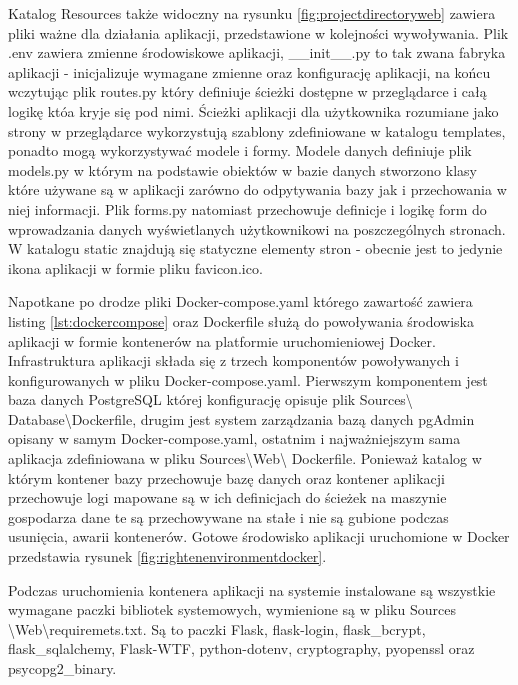 \documentclass[a4paper, 10pt, twoside, openright]{report}
\begin{document}
\begin{large}
{Katalog Resources także widoczny na rysunku \ref*{fig:projectdirectoryweb} 
zawiera pliki ważne dla działania aplikacji, przedstawione w kolejności 
wywoływania. Plik .env zawiera zmienne środowiskowe aplikacji, \_\_init\_\_.py 
to tak zwana fabryka aplikacji - inicjalizuje wymagane zmienne oraz konfigurację
 aplikacji, na końcu wczytując plik routes.py który definiuje ścieżki dostępne 
w przeglądarce i całą logikę któa kryje się pod nimi. Ścieżki aplikacji dla 
użytkownika rozumiane jako strony w przeglądarce wykorzystują szablony 
zdefiniowane w katalogu templates, ponadto mogą wykorzystywać modele i formy. 
Modele danych definiuje plik models.py w którym na podstawie obiektów w bazie 
danych stworzono klasy które używane są w aplikacji zarówno do odpytywania bazy 
jak i przechowania w niej informacji. Plik forms.py natomiast przechowuje 
definicje i logikę form do wprowadzania danych wyświetlanych użytkownikowi na 
poszczególnych stronach. W katalogu static znajdują się statyczne elementy stron
 - obecnie jest to jedynie ikona aplikacji w formie pliku favicon.ico.}

\medskip
{Napotkane po drodze pliki Docker-compose.yaml którego zawartość zawiera listing
 \ref*{lst:dockercompose} oraz Dockerfile służą do powoływania środowiska 
aplikacji w formie kontenerów na platformie uruchomieniowej Docker. 
Infrastruktura aplikacji składa się z trzech komponentów powoływanych i 
konfigurowanych w pliku Docker-compose.yaml. Pierwszym komponentem jest baza 
danych PostgreSQL której konfigurację opisuje plik Sources\textbackslash
Database\textbackslash Dockerfile, drugim jest system zarządzania bazą danych 
pgAdmin opisany w samym Docker-compose.yaml, ostatnim i najważniejszym sama 
aplikacja zdefiniowana w pliku Sources\textbackslash Web\textbackslash
Dockerfile. Ponieważ katalog w którym kontener bazy przechowuje bazę danych oraz
 kontener aplikacji przechowuje logi mapowane są w ich definicjach do ścieżek na
 maszynie gospodarza dane te są przechowywane na stałe i nie są gubione podczas 
usunięcia, awarii kontenerów. Gotowe środowisko aplikacji uruchomione w Docker 
przedstawia rysunek \ref*{fig:rightenenvironmentdocker}.}

{Podczas uruchomienia kontenera aplikacji na systemie instalowane są wszystkie 
wymagane paczki bibliotek systemowych, wymienione są w pliku Sources
\textbackslash Web\textbackslash requiremets.txt. Są to paczki Flask, 
flask-login, flask\_bcrypt, flask\_sqlalchemy, Flask-WTF, python-dotenv, 
cryptography, pyopenssl oraz psycopg2\_binary.}


\end{large}
\end{document}
